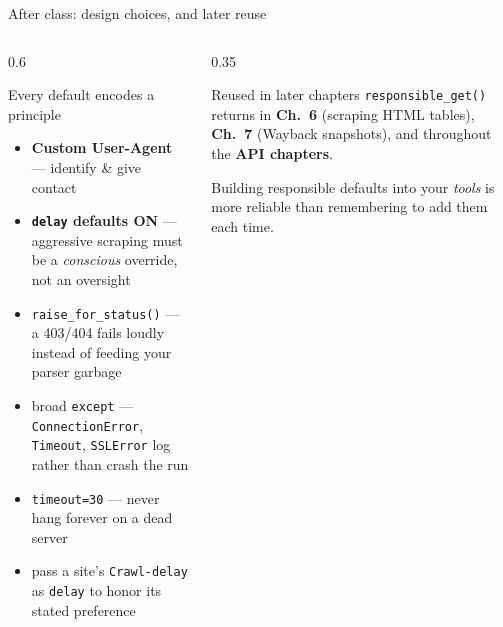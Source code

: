 \documentclass[9pt,aspectratio=169]{beamer}
\begin{document}
\begin{frame}{After class: design choices, and later reuse}
    \begin{columns}[T]
        \begin{column}{0.6\textwidth}
            \begin{block}{Every default encodes a principle}
                \begin{itemize}\small
                    \item \textbf{Custom User-Agent} --- identify \& give contact
                    \item \textbf{\texttt{delay} defaults ON} --- aggressive scraping must be a \textit{conscious} override, not an oversight
                    \item \texttt{raise\_for\_status()} --- a 403/404 fails loudly instead of feeding your parser garbage
                    \item broad \texttt{except} --- \texttt{ConnectionError}, \texttt{Timeout}, \texttt{SSLError} log rather than crash the run
                    \item \texttt{timeout=30} --- never hang forever on a dead server
                    \item pass a site's \texttt{Crawl-delay} as \texttt{delay} to honor its stated preference
                \end{itemize}
            \end{block}
        \end{column}
        \begin{column}{0.35\textwidth}
            \begin{alertblock}{Reused in later chapters}
                \footnotesize \texttt{responsible\_get()} returns in \textbf{Ch.~6} (scraping HTML tables), \textbf{Ch.~7} (Wayback snapshots), and throughout the \textbf{API chapters}.

                \medskip

                Building responsible defaults into your \textit{tools} is more reliable than remembering to add them each time.
            \end{alertblock}
        \end{column}
    \end{columns}
\end{frame}
\end{document}
